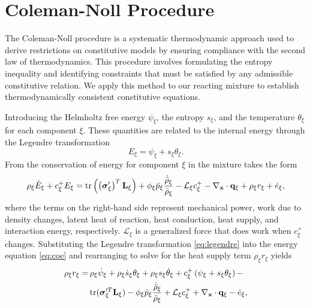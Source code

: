 \section{Coleman-Noll Procedure}
\label{app:coleman_noll}
\label{sec:coleman}

The Coleman-Noll procedure is a systematic thermodynamic approach used to derive restrictions on constitutive models by ensuring compliance with the second law of thermodynamics. This procedure involves formulating the entropy inequality and identifying constraints that must be satisfied by any admissible constitutive relation. We apply this method to our reacting mixture to establish thermodynamically consistent constitutive equations.

Introducing the Helmholtz free energy $\psi_\xi$, the entropy $s_\xi$, and the temperature $\theta_\xi$ for each component $\xi$. These quantities are related to the internal energy through the Legendre transformation
\begin{equation}
  E_\xi = \psi_\xi + s_\xi \theta_{\xi}.
  \label{eq:legendre}
\end{equation}
From \cite{drumheller2000} the conservation of energy for component $\xi$ in the mixture takes the form
\begin{equation}
  \rho_{\xi} \dot{E}_{\xi} + c_{\xi}^{+} E_{\xi} = \mathrm{tr}\left(\left(\boldsymbol{\sigma}^{\prime}_{\xi}\right)^{T} \mathbf{L}_{\xi}\right) + \phi_{\xi}\bar{p}_\xi  \frac{\dot{\bar\rho}_{\xi}}{\bar\rho_{\xi}} - \mathcal{L}_{\xi} c_{\xi}^{+} - \nabla_{\mathbf{x}} \cdot \mathbf{q}_{\xi} + \rho_{\xi} r_{\xi} + \dot{e}_{\xi},
  \label{eq:coe}
\end{equation}
where the terms on the right-hand side represent mechanical power, work due to density changes, latent heat of reaction, heat conduction, heat supply, and interaction energy, respectively. $\mathcal{L}_\xi$ is a generalized force that does work when $c^{+}_\xi$ changes.  Substituting the Legendre transformation \eqref{eq:legendre} into the energy equation \eqref{eq:coe} and rearranging to solve for the heat supply term $\rho_\xi r_{\xi}$ yields
\begin{align}
  \rho_{\xi} r_{\xi} =& \, \rho_{\xi} \dot{\psi}_{\xi} + \rho_\xi \dot{s}_\xi \theta_\xi + \rho_\xi s_\xi \dot\theta_\xi + c_{\xi}^{+} \left(\psi_{\xi} + s_\xi \theta_\xi\right) - \notag \\
  & \, \mathrm{tr}(\boldsymbol{\sigma}^{\prime T}_{\xi} \mathbf{L}_{\xi}) - \phi_{\xi} \bar{p}_\xi \frac{\dot{\bar\rho}_{\xi}}{\bar\rho_{\xi}} + \mathcal{L}_{\xi} c_{\xi}^{+} + \nabla_{\mathbf{x}} \cdot \mathbf{q}_{\xi} - \dot{e}_{\xi}, \label{eq:rho_r}
\end{align}
